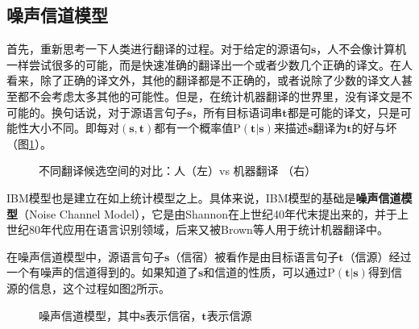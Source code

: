 
\subsection{噪声信道模型}

\vspace{0.5em}
\parinterval 首先，重新思考一下人类进行翻译的过程。对于给定的源语句$\mathbf{s}$，人不会像计算机一样尝试很多的可能，而是快速准确的翻译出一个或者少数几个正确的译文。在人看来，除了正确的译文外，其他的翻译都是不正确的，或者说除了少数的译文人甚至都不会考虑太多其他的可能性。但是，在统计机器翻译的世界里，没有译文是不可能的。换句话说，对于源语言句子$\mathbf{s}$，所有目标语词串$\mathbf{t}$都是可能的译文，只是可能性大小不同。即每对$(\mathbf{s},\mathbf{t})$都有一个概率值$\textrm{P}(\mathbf{t}|\mathbf{s})$来描述$\mathbf{s}$翻译为$\mathbf{t}$的好与坏（图\ref{fig:3-12}）。

\begin{figure}[htp]
    \centering

\caption{不同翻译候选空间的对比：人（左）vs 机器翻译 （右）}
    \label{fig:3-12}
\end{figure}

\vspace{-0.5em}
\parinterval IBM模型也是建立在如上统计模型之上。具体来说，IBM模型的基础是{\small\sffamily\bfseries{噪声信道模型}}（Noise Channel Model），它是由Shannon在上世纪40年代末提出来的\cite{shannon1949communication}，并于上世纪80年代应用在语言识别领域，后来又被Brown等人用于统计机器翻译中\cite{brown1990statistical}。

\parinterval 在噪声信道模型中，源语言句子$\mathbf{s}$（信宿）被看作是由目标语言句子$\mathbf{t}$（信源）经过一个有噪声的信道得到的。如果知道了$\mathbf{s}$和信道的性质，可以通过$\textrm{P}(\mathbf{t}|\mathbf{s})$得到信源的信息，这个过程如图\ref{fig:3-13}所示。

\begin{figure}[htp]
    \centering

    \caption{噪声信道模型，其中$\mathbf{s}$表示信宿，$\mathbf{t}$表示信源}
    \label{fig:3-13}
\end{figure}

